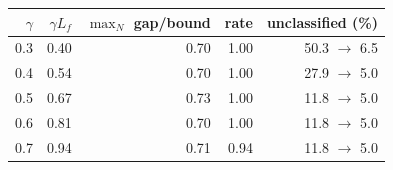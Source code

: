 \begin{tabular}{rrrrr}
\toprule
$\gamma$ & $\gamma L_f$ & $\max_N$ gap/bound & rate & unclassified (\%) \\
\midrule
0.3 & 0.40 & 0.70 & 1.00 & 50.3 $\to$ 6.5 \\
0.4 & 0.54 & 0.70 & 1.00 & 27.9 $\to$ 5.0 \\
0.5 & 0.67 & 0.73 & 1.00 & 11.8 $\to$ 5.0 \\
0.6 & 0.81 & 0.70 & 1.00 & 11.8 $\to$ 5.0 \\
0.7 & 0.94 & 0.71 & 0.94 & 11.8 $\to$ 5.0 \\
\bottomrule
\end{tabular}
